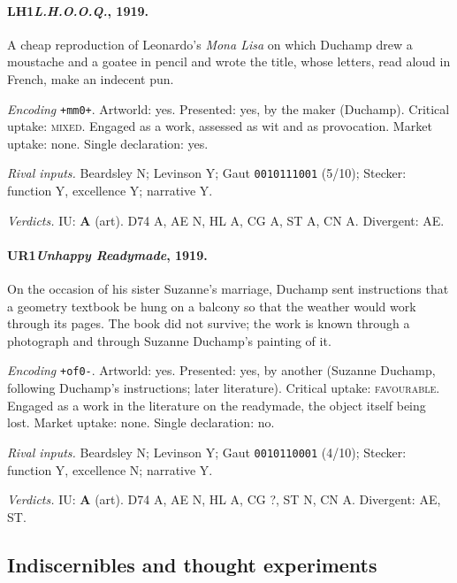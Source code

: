 \paragraph{LH1\enspace \emph{L.H.O.O.Q.}, 1919.}
A cheap reproduction of Leonardo's \emph{Mona Lisa} on which Duchamp drew a moustache and a goatee in pencil and wrote the title, whose letters, read aloud in French, make an indecent pun.\par
\noindent\textit{Encoding} \texttt{+mm0+}. Artworld: yes. Presented: yes, by the maker (Duchamp). Critical uptake: \textsc{mixed}. Engaged as a work, assessed as wit and as provocation. Market uptake: none. Single declaration: yes.\par
\noindent\textit{Rival inputs.} Beardsley N; Levinson Y; Gaut \texttt{0010111001} (5/10); Stecker: function Y, excellence Y; narrative Y.\par
\noindent\textit{Verdicts.} IU: \textbf{A} (art). D74 A, AE N, HL A, CG A, ST A, CN A. Divergent: AE.\par

\paragraph{UR1\enspace \emph{Unhappy Readymade}, 1919.}
On the occasion of his sister Suzanne's marriage, Duchamp sent instructions that a geometry textbook be hung on a balcony so that the weather would work through its pages. The book did not survive; the work is known through a photograph and through Suzanne Duchamp's painting of it.\par
\noindent\textit{Encoding} \texttt{+of0-}. Artworld: yes. Presented: yes, by another (Suzanne Duchamp, following Duchamp's instructions; later literature). Critical uptake: \textsc{favourable}. Engaged as a work in the literature on the readymade, the object itself being lost. Market uptake: none. Single declaration: no.\par
\noindent\textit{Rival inputs.} Beardsley N; Levinson Y; Gaut \texttt{0010110001} (4/10); Stecker: function Y, excellence N; narrative Y.\par
\noindent\textit{Verdicts.} IU: \textbf{A} (art). D74 A, AE N, HL A, CG ?, ST N, CN A. Divergent: AE, ST.\par

\subsection{Indiscernibles and thought experiments}

